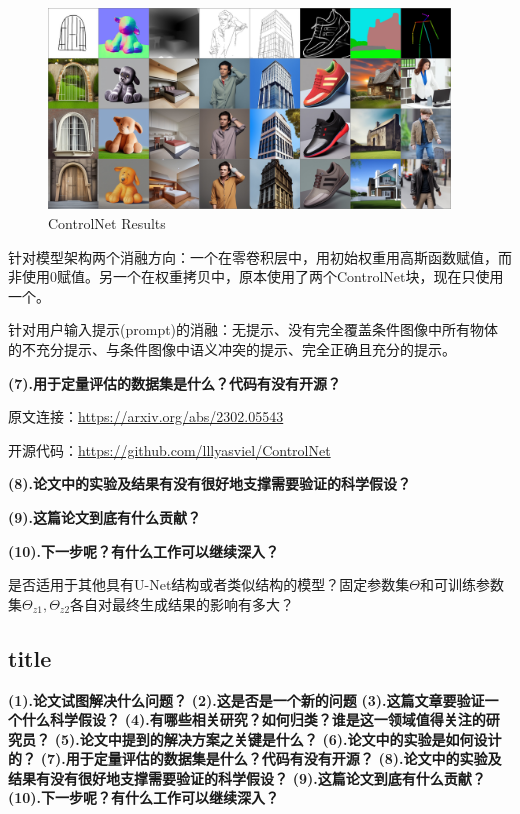 \documentclass[12pt, a4paper, oneside]{ctexart}
\begin{document}
    \begin{figure}[htbp]
        \centering
        \includegraphics[width=0.95\textwidth]{pic/4.10_ControlNetResults.jpg}
        \caption{ControlNet Results}
        \label{ControlNetResults}
    \end{figure}


    针对模型架构两个消融方向：一个在零卷积层中，用初始权重用高斯函数赋值，而非使用$0$赋值。另一个在权重拷贝中，原本使用了两个ControlNet块，现在只使用一个。

    针对用户输入提示(prompt)的消融：无提示、没有完全覆盖条件图像中所有物体的不充分提示、与条件图像中语义冲突的提示、完全正确且充分的提示。

    \noindent\textbf{(7).用于定量评估的数据集是什么？代码有没有开源？}

    原文连接：\url{https://arxiv.org/abs/2302.05543}

    开源代码：\url{https://github.com/lllyasviel/ControlNet}

    \noindent\textbf{(8).论文中的实验及结果有没有很好地支撑需要验证的科学假设？}



    \noindent\textbf{(9).这篇论文到底有什么贡献？}



    \noindent\textbf{(10).下一步呢？有什么工作可以继续深入？}

    是否适用于其他具有U-Net结构或者类似结构的模型？固定参数集$\Theta$和可训练参数集$\Theta_{z1},\Theta_{z2}$各自对最终生成结果的影响有多大？


    \subsection{title}
    \noindent\textbf{(1).论文试图解决什么问题？}
    \noindent\textbf{(2).这是否是一个新的问题}
    \noindent\textbf{(3).这篇文章要验证一个什么科学假设？}
    \noindent\textbf{(4).有哪些相关研究？如何归类？谁是这一领域值得关注的研究员？}
    \noindent\textbf{(5).论文中提到的解决方案之关键是什么？}
    \noindent\textbf{(6).论文中的实验是如何设计的？}
    \noindent\textbf{(7).用于定量评估的数据集是什么？代码有没有开源？}
    \noindent\textbf{(8).论文中的实验及结果有没有很好地支撑需要验证的科学假设？}
    \noindent\textbf{(9).这篇论文到底有什么贡献？}
    \noindent\textbf{(10).下一步呢？有什么工作可以继续深入？}
\end{document}
